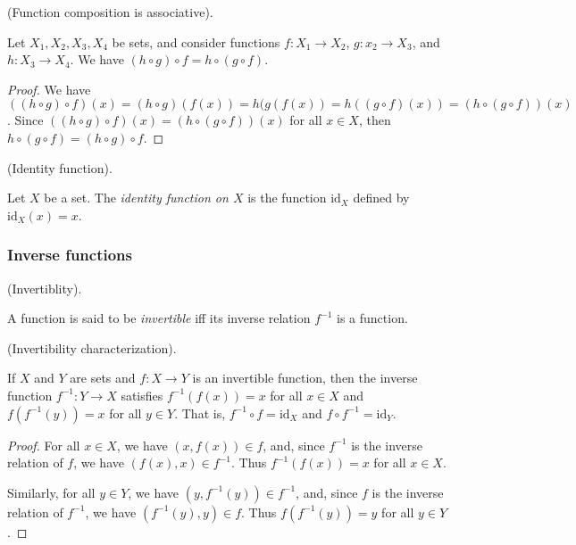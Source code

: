 \begin{theorem}
    (Function composition is associative).

    Let $X_1, X_2, X_3, X_4$ be sets, and consider functions $f:X_1 \rightarrow X_2$, $g:x_2 \rightarrow X_3$, and $h:X_3 \rightarrow X_4$. We have $(h \circ g) \circ f = h \circ (g \circ f)$.
\end{theorem}

\begin{proof}
    We have $((h \circ g) \circ f)(x) = (h \circ g)(f(x)) = h(g(f(x)) = h((g \circ f)(x)) = (h \circ (g \circ f))(x)$. Since $((h \circ g) \circ f)(x) = (h \circ (g \circ f))(x)$ for all $x \in X$, then $h \circ (g \circ f) = (h \circ g) \circ f$. 
\end{proof}

\begin{defn}
    (Identity function).

    Let $X$ be a set. The \textit{identity function on $X$} is the function $\text{id}_X$ defined by $\text{id}_X(x) = x$.
\end{defn}

\subsubsection*{Inverse functions}

\begin{defn}
\label{ch::logic_pf_fns::defn::inverse_fn}
    (Invertiblity).

    A function is said to be \textit{invertible} iff its inverse relation $f^{-1}$ is a function.
\end{defn}

\begin{theorem}
    (Invertibility characterization).

    If $X$ and $Y$ are sets and $f:X \rightarrow Y$ is an invertible function, then the inverse function $f^{-1}:Y \rightarrow X$ satisfies $f^{-1}(f(x)) = x$ for all $x \in X$ and $f(f^{-1}(y)) = x$ for all $y \in Y$. That is, $f^{-1} \circ f = \text{id}_X$ and $f \circ f^{-1} = \text{id}_Y$.
\end{theorem}

\begin{proof}
    For all $x \in X$, we have $(x, f(x)) \in f$, and, since $f^{-1}$ is the inverse relation of $f$, we have $(f(x), x) \in f^{-1}$. Thus $f^{-1}(f(x)) = x$ for all $x \in X$.
    
    Similarly, for all $y \in Y$, we have $(y, f^{-1}(y)) \in f^{-1}$, and, since $f$ is the inverse relation of $f^{-1}$, we have $(f^{-1}(y), y) \in f$. Thus $f(f^{-1}(y)) = y$ for all $y \in Y$.
\end{proof}

